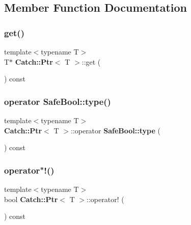 \subsection{Member Function Documentation}
\mbox{\label{class_catch_1_1_ptr_a2158bb2a1a21b001a2e72d4591d3e31e}} 
\subsubsection{get()}
{\footnotesize\ttfamily template$<$typename T$>$ \\
T$\ast$ \textbf{ Catch\+::\+Ptr}$<$ T $>$\+::get (\begin{DoxyParamCaption}{ }\end{DoxyParamCaption}) const\hspace{0.3cm}{\ttfamily [inline]}}

\mbox{\label{class_catch_1_1_ptr_a102838cb25643586679e12efca26a3af}} 
\subsubsection{operator Safe\+Bool\+::type()}
{\footnotesize\ttfamily template$<$typename T$>$ \\
\textbf{ Catch\+::\+Ptr}$<$ T $>$\+::operator \textbf{ Safe\+Bool\+::type} (\begin{DoxyParamCaption}{ }\end{DoxyParamCaption}) const\hspace{0.3cm}{\ttfamily [inline]}}

\mbox{\label{class_catch_1_1_ptr_a85c4fe6cebf2a69d0416020b65714360}} 
\subsubsection{operator"!()}
{\footnotesize\ttfamily template$<$typename T$>$ \\
bool \textbf{ Catch\+::\+Ptr}$<$ T $>$\+::operator! (\begin{DoxyParamCaption}{ }\end{DoxyParamCaption}) const\hspace{0.3cm}{\ttfamily [inline]}}

